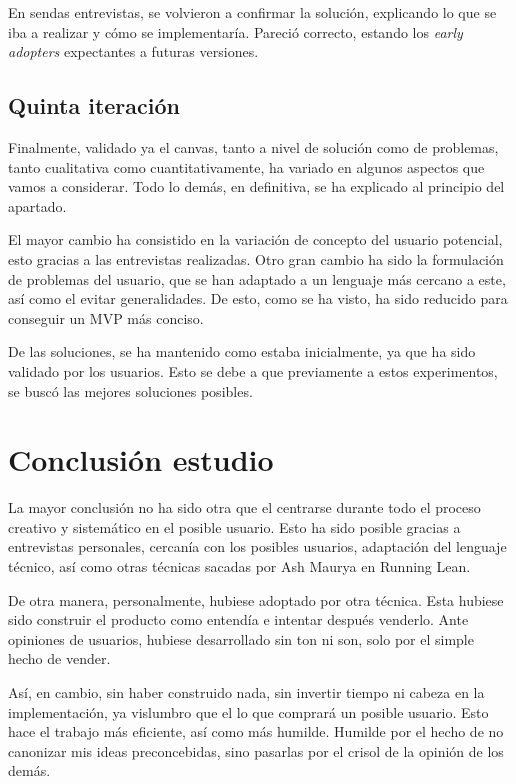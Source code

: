 En sendas entrevistas, se volvieron a confirmar la solución, explicando lo que se iba a realizar y cómo se implementaría. Pareció correcto, estando los \textit{early adopters} expectantes a futuras versiones.

\subsection{Quinta iteración}
Finalmente, validado ya el canvas, tanto a nivel de solución como de problemas, tanto cualitativa como cuantitativamente, ha variado en algunos aspectos que vamos a considerar. Todo lo demás, en definitiva, se ha explicado al principio del apartado.

El mayor cambio ha consistido en la variación de concepto del usuario potencial, esto gracias a las entrevistas realizadas. Otro gran cambio ha sido la formulación de problemas del usuario, que se han adaptado a un lenguaje más cercano a este, así como el evitar generalidades. De esto, como se ha visto, ha sido reducido para conseguir un MVP más conciso.

De las soluciones, se ha mantenido como estaba inicialmente, ya que ha sido validado por los usuarios. Esto se debe a que previamente a estos experimentos, se buscó las mejores soluciones posibles.


\section{Conclusión estudio}\label{sec:conclusiones_estudio}

La mayor conclusión no ha sido otra que el centrarse durante todo el proceso creativo y sistemático en el posible usuario. Esto ha sido posible gracias a entrevistas personales, cercanía con los posibles usuarios, adaptación del lenguaje técnico, así como otras técnicas sacadas por Ash Maurya en Running Lean.

De otra manera, personalmente, hubiese adoptado por otra técnica. Esta hubiese sido construir el producto como entendía e intentar después venderlo. Ante opiniones de usuarios, hubiese desarrollado sin ton ni son, solo por el simple hecho de vender.

Así, en cambio, sin haber construido nada, sin invertir tiempo ni cabeza en la implementación, ya vislumbro que el lo que comprará un posible usuario. Esto hace el trabajo más eficiente, así como más humilde. Humilde por el hecho de no canonizar mis ideas preconcebidas, sino pasarlas por el crisol de la opinión de los demás.